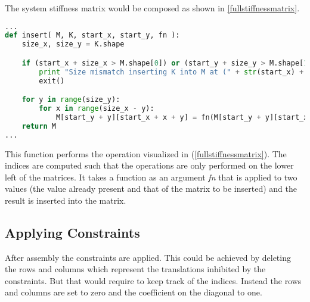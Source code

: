The system stiffness matrix would be composed as shown in \cref{fullstiffnessmatrix}.

\begin{inconsolata}
\begin{minipage}{\linewidth}
\begin{lstlisting}[language=python]
...
def insert( M, K, start_x, start_y, fn ):
    size_x, size_y = K.shape

    if (start_x + size_x > M.shape[0]) or (start_y + size_y > M.shape[1]):
        print "Size mismatch inserting K into M at (" + str(start_x) + "," + str(start_y) + ")."
        exit()

    for y in range(size_y):
        for x in range(size_x - y):
            M[start_y + y][start_x + x + y] = fn(M[start_y + y][start_x + x + y], K[y][x + y])
    return M
...
\end{lstlisting}
\end{minipage}
\end{inconsolata}

This function performs the operation visualized in (\cref{fullstiffnessmatrix}).
The indices are computed such that the operations are only performed on the lower left of the matrices.
It takes a function as an argument \textit{fn} that is applied to two values (the value already present and that of the matrix to be inserted) and the result is inserted into the matrix. 

\newcommand{\cb}[1]{\textcolor{solarized-red}{#1}}
\newcommand{\cc}[1]{\textcolor{solarized-cyan}{#1}}
\newcommand{\cg}[1]{\textcolor{solarized-green}{#1}}

\newcommand{\tikzmarkb}[1]{\tikz[overlay,remember picture] \node (#1) {};}
\newcommand{\DrawBoxb}[2][]{%
    \tikz[overlay,remember picture]{
    \draw[solarized-red,#1]
      ($(left1)+(-0.2em,0.6em)$) rectangle
      ($(right1)+(0.1em,-0.3em)$);
    \draw[solarized-cyan,#1]
      ($(left2)+(-0.2em,0.6em)$) rectangle
      ($(right2)+(0.1em,-0.3em)$);
    \draw[solarized-green,#1]
      ($(left3)+(-0.2em,0.6em)$) rectangle
      ($(right3)+(0.1em,-0.3em)$);}
}

\subsection{Applying Constraints}
\label{sec:applyconst}

After assembly the constraints are applied. This could be achieved by deleting the rows and columns which represent the translations inhibited by the constraints.
But that would require to keep track of the indices. Instead the rows and columns are set to zero and the coefficient on the diagonal to one.

